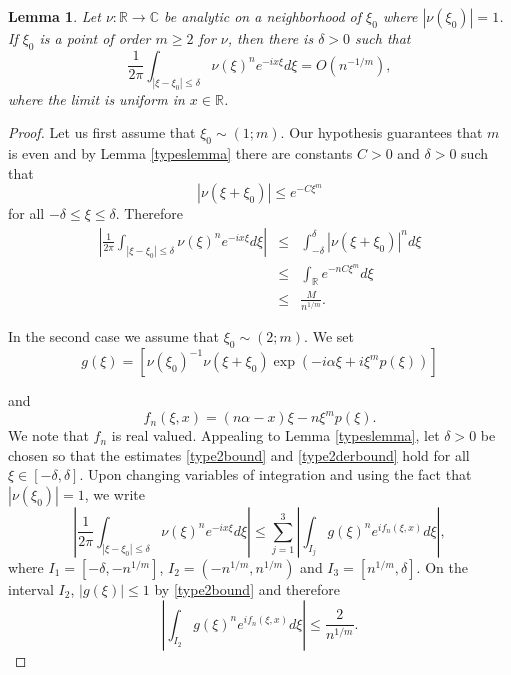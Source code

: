 \documentclass{article}
\theoremstyle{theorem}
\newtheorem{lemma}[theorem]{Lemma}
\theoremstyle{remark}
\begin{document}
\begin{lemma}\label{bigolem}
Let $\nu:\mathbb{R}\rightarrow\mathbb{C}$ be analytic on a neighborhood of $\xi_0$ where $|\nu(\xi_0)|=1$. If $\xi_0$ is a point of order $m\geq 2$ for $\nu$, then there is
$\delta>0$ such that
\begin{equation*}
\frac{1}{2\pi}\int_{|\xi-\xi_0|\leq \delta}\nu(\xi)^n
e^{-ix\xi}d\xi=O(n^{-1/m}),
\end{equation*}
where the limit is uniform in $x\in \mathbb{R}$.
\end{lemma}
\begin{proof}
 Let us first assume that $\xi_0\sim(1;m)$. Our hypothesis guarantees that $m$ is
even and by Lemma \ref{typeslemma} there are constants $C>0$ and $\delta>0$ such that
\begin{equation*}
|\nu(\xi+\xi_0)|\leq e^{-C\xi^m}
\end{equation*}
for all $-\delta\leq\xi\leq \delta$. Therefore
\begin{eqnarray*}
\left| \frac{1}{2\pi}\int_{|\xi-\xi_0|\leq \delta}\nu(\xi)^n
e^{-ix\xi}d\xi\right|&\leq& \int_{-\delta}^\delta |\nu(\xi+\xi_0)|^nd\xi\\
&\leq&\int_{\mathbb{R}}e^{-nC\xi^m}d\xi\\
&\leq& \frac{M}{n^{1/m}}.
\end{eqnarray*}

In the second case we assume that $\xi_0\sim(2;m)$. We set
\begin{equation*}
g(\xi)=\left[\nu(\xi_0)^{-1}\nu(\xi+\xi_0)\exp(-i\alpha\xi+i\xi^mp(\xi))\right
]
\end{equation*}

and
\begin{equation*}
 f_n(\xi,x)=(n\alpha-x) \xi-n\xi^mp(\xi).
\end{equation*}
We note that $f_n$ is real valued. Appealing to Lemma \ref{typeslemma}, let $\delta>0$ be chosen so that the estimates \eqref{type2bound} and \eqref{type2derbound} hold for all $\xi\in[-\delta,\delta]$. Upon changing variables of integration and using the fact that $|\nu(\xi_0)|=1$, we write
\begin{equation*}
 \left|\frac{1}{2\pi}\int_{|\xi-\xi_0|\leq \delta}\nu(\xi)^n
e^{-ix\xi}d\xi\right|\leq\sum_{j=1}^3\left|\int_{I_j}g(\xi)^ne^{if_n(\xi,x)}d\xi\right|,
\end{equation*}
where $I_1=[-\delta,-n^{1/m}]$, $I_2=(-n^{1/m},n^{1/m})$ and $I_3=[n^{1/m},\delta]$. On the interval $I_2$, $|g(\xi)|\leq 1$ by \eqref{type2bound} and therefore
\begin{equation*}
 \left|\int_{I_2}g(\xi)^ne^{if_n(\xi,x)}d\xi\right|\leq \frac{2}{n^{1/m}}.
\end{equation*}


\end{proof}
\end{document}
